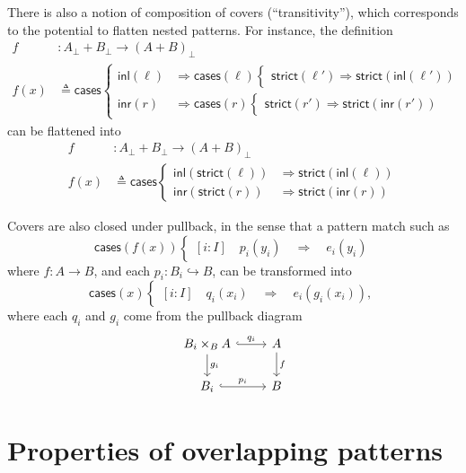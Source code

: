 \documentclass[conference]{IEEEtran}
\newcommand{\hookto}{\hookrightarrow}
\newcommand{\Branch}{\Rightarrow}
\begin{document}
There is also a notion of composition of covers (``transitivity''), which corresponds to the potential to flatten nested patterns. For instance, the definition
\begin{align*}
f &: A_\bot + B_\bot \to \left(A + B\right)_\bot
\\ f(x) &\triangleq \mathsf{cases}
\begin{cases}
\mathsf{inl}(\ell) &\Branch \mathsf{cases}(\ell)
  \begin{cases}
  \mathsf{strict}(\ell') \Branch \mathsf{strict}(\mathsf{inl}(\ell'))
  \end{cases}
\\
\mathsf{inr}(r) &\Branch \mathsf{cases}(r)
  \begin{cases}
  \mathsf{strict}(r') \Branch \mathsf{strict}(\mathsf{inr}(r'))
  \end{cases}
\end{cases}
\end{align*}
can be flattened into
\begin{align*}
f &: A_\bot + B_\bot \to \left(A + B\right)_\bot
\\ f(x) &\triangleq \mathsf{cases}
\begin{cases}
\mathsf{inl}(\mathsf{strict}(\ell)) &\Branch \mathsf{strict}(\mathsf{inl}(\ell))
\\
\mathsf{inr}(\mathsf{strict}(r)) &\Branch \mathsf{strict}(\mathsf{inr}(r))
\end{cases}
\end{align*}

Covers are also closed under pullback, in the sense that a pattern match such as
\[
\mathsf{cases}(f(x))
\begin{cases}
[i : I] \quad p_i(y_i) \quad \Branch \quad e_i(y_i)
\end{cases}
\]
where $f : A \to B$, and each $p_i : B_i \hookto B$,
can be transformed into
\[
\mathsf{cases}(x)
\begin{cases}
[i : I] \quad q_i(x_i) \quad \Branch \quad e_i(g_i(x_i)),
\end{cases}
\]
where each $q_i$ and $g_i$ come from the pullback diagram
\begin{equation*}
\begin{tikzcd}
B_i \times_B A \arrow[r, hook, "q_i"]
   \arrow[d, "g_i"]
& A \arrow[d, "f"]
\\ B_i \arrow[r, hook, "p_i"]
& B
\end{tikzcd}
\end{equation*}

\section{Properties of overlapping patterns}
\end{document}
